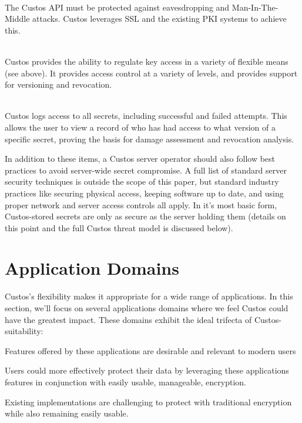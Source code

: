 \begin{packed_desc}
\item[Secure Communication Primitives] \hfill \\ The Custos API must
  be protected against eavesdropping and Man-In-The-Middle
  attacks. Custos leverages SSL and the existing PKI systems to
  achieve this.
\item[Access Control] \hfill \\ Custos provides the ability to
  regulate key access in a variety of flexible means (see above). It
  provides access control at a variety of levels, and provides support
  for versioning and revocation.
\item[Access Auditing] \hfill \\ Custos logs access to all secrets,
  including successful and failed attempts. This allows the user to
  view a record of who has had access to what version of a specific
  secret, proving the basis for damage assessment and revocation
  analysis.
\end{packed_desc}

In addition to these items, a Custos server operator should also
follow best practices to avoid server-wide secret compromise. A full
list of standard server security techniques is outside the scope of
this paper, but standard industry practices like securing physical
access, keeping software up to date, and using proper network and
server access controls all apply. In it's most basic form,
Custos-stored secrets are only as secure as the server holding them
(details on this point and the full Custos threat model is discussed
below).

\section{Application Domains}

Custos's flexibility makes it appropriate for a wide range of
applications. In this section, we'll focus on several applications
domains where we feel Custos could have the greatest impact. These
domains exhibit the ideal trifecta of Custos-suitability:

\begin{packed_item}
\item Features offered by these applications are desirable and relevant
  to modern users
\item Users could more effectively protect their data by leveraging
  these applications features in conjunction with easily usable,
  manageable, encryption.
\item Existing implementations are challenging to protect with traditional
  encryption while also remaining easily usable.
\end{packed_item}

